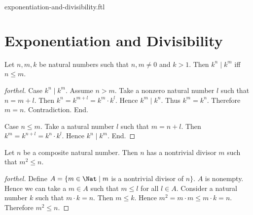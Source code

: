 \documentclass{naproche-library}
\begin{document}
\begin{smodule}{exponentiation-and-divisibility.ftl}

  \section*{Exponentiation and Divisibility}

  \begin{proposition}[forthel,id=ARITHMETIC_13_8426075493236736,printid]
    Let $n, m, k$ be natural numbers such that $n, m \neq 0$ and $k > 1$.
    Then $k^{n} \mid k^{m}$ iff $n \leq m$.
  \end{proposition}
  \begin{proof}[forthel]
    Case $k^{n} \mid k^{m}$.
      Assume $n > m$.
      Take a nonzero natural number $l$ such that $n = m + l$.
      Then $k^{n}
        = k^{m + l}
        = k^{m} \cdot k^{l}$.
      Hence $k^{m} \mid k^{n}$.
      Thus $k^{m} = k^{n}$.
      Therefore $m = n$.
      Contradiction.
    End.

    Case $n \leq m$.
      Take a natural number $l$ such that $m = n + l$.
      Then $k^{m}
        = k^{n + l}
        = k^{n} \cdot k^{l}$.
      Hence $k^{n} \mid k^{m}$.
    End.
  \end{proof}

  \begin{proposition}[forthel,id=ARITHMETIC_13_797196163219456,printid]
    Let $n$ be a composite natural number.
    Then $n$ has a nontrivial divisor $m$ such that $m^{2} \leq n$.
  \end{proposition}
  \begin{proof}[forthel]
    Define $A = \{ m \in \Nat \mid m$ is a nontrivial divisor of $n \}$.
    $A$ is nonempty.
    Hence we can take a $m \in A$ such that $m \leq l$ for all $l \in A$.
    Consider a natural number $k$ such that $m \cdot k = n$.
    Then $m \leq k$.
    Hence $m^{2} = m \cdot m \leq m \cdot k = n$.
    Therefore $m^{2} \leq n$.
  \end{proof}
\end{smodule}
\end{document}
